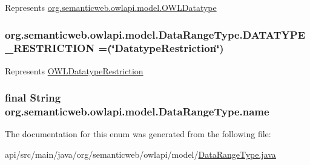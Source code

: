Represents \hyperlink{interfaceorg_1_1semanticweb_1_1owlapi_1_1model_1_1_o_w_l_datatype}{org.\-semanticweb.\-owlapi.\-model.\-O\-W\-L\-Datatype} \hypertarget{enumorg_1_1semanticweb_1_1owlapi_1_1model_1_1_data_range_type_aa9614034d148b7d08277642c01bcefc5}{
\subsubsection[{D\-A\-T\-A\-T\-Y\-P\-E\-\_\-\-R\-E\-S\-T\-R\-I\-C\-T\-I\-O\-N}]{\setlength{\rightskip}{0pt plus 5cm}org.\-semanticweb.\-owlapi.\-model.\-Data\-Range\-Type.\-D\-A\-T\-A\-T\-Y\-P\-E\-\_\-\-R\-E\-S\-T\-R\-I\-C\-T\-I\-O\-N =(\char`\"{}Datatype\-Restriction\char`\"{})}}\label{enumorg_1_1semanticweb_1_1owlapi_1_1model_1_1_data_range_type_aa9614034d148b7d08277642c01bcefc5}
Represents \hyperlink{interfaceorg_1_1semanticweb_1_1owlapi_1_1model_1_1_o_w_l_datatype_restriction}{O\-W\-L\-Datatype\-Restriction} \hypertarget{enumorg_1_1semanticweb_1_1owlapi_1_1model_1_1_data_range_type_a517a0801c2111a656af0b526996d36b4}{
\subsubsection[{name}]{\setlength{\rightskip}{0pt plus 5cm}final String org.\-semanticweb.\-owlapi.\-model.\-Data\-Range\-Type.\-name\hspace{0.3cm}{\ttfamily [private]}}}\label{enumorg_1_1semanticweb_1_1owlapi_1_1model_1_1_data_range_type_a517a0801c2111a656af0b526996d36b4}


The documentation for this enum was generated from the following file\-:\begin{DoxyCompactItemize}
\item 
api/src/main/java/org/semanticweb/owlapi/model/\hyperlink{_data_range_type_8java}{Data\-Range\-Type.\-java}\end{DoxyCompactItemize}
